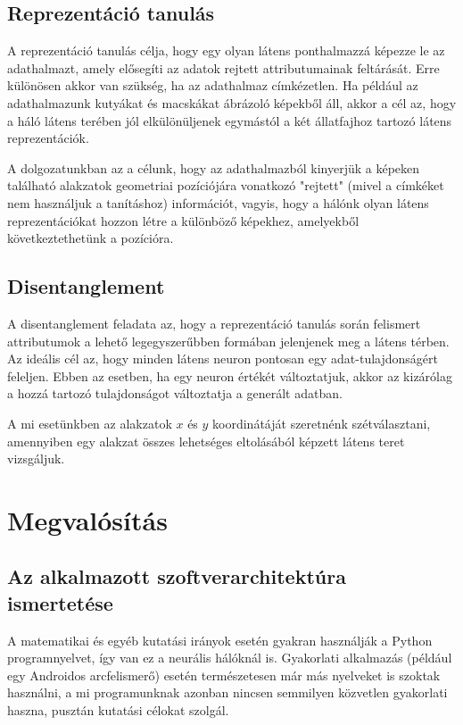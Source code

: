 \section{Reprezentáció tanulás}

A reprezentáció tanulás célja, hogy egy olyan látens ponthalmazzá képezze le az adathalmazt, amely elősegíti az adatok rejtett attributumainak feltárását. Erre különösen akkor van szükség, ha az adathalmaz címkézetlen. Ha például az adathalmazunk kutyákat és macskákat ábrázoló képekből áll, akkor a cél az, hogy a háló látens terében jól elkülönüljenek egymástól a két állatfajhoz tartozó látens reprezentációk.

A dolgozatunkban az a célunk, hogy az adathalmazból kinyerjük a képeken található alakzatok geometriai pozíciójára vonatkozó "rejtett" (mivel a címkéket nem használjuk a tanításhoz) információt, vagyis, hogy a hálónk olyan látens reprezentációkat hozzon létre a különböző képekhez, amelyekből következtethetünk a pozícióra.

\section{Disentanglement}

A disentanglement feladata az, hogy a reprezentáció tanulás során felismert attributumok a lehető legegyszerűbben formában jelenjenek meg a látens térben. Az ideális cél az, hogy minden látens neuron pontosan egy adat-tulajdonságért feleljen. Ebben az esetben, ha egy neuron értékét változtatjuk, akkor az kizárólag a hozzá tartozó tulajdonságot változtatja a generált adatban.

A mi esetünkben az alakzatok $x$ és $y$ koordinátáját szeretnénk szétválasztani, amennyiben egy alakzat összes lehetséges eltolásából képzett látens teret vizsgáljuk.

\chapter{Megvalósítás}

\section{Az alkalmazott szoftverarchitektúra ismertetése}

A matematikai és egyéb kutatási irányok esetén gyakran használják a Python programnyelvet, így van ez a neurális hálóknál is. Gyakorlati alkalmazás (például egy Androidos arcfelismerő) esetén természetesen már más nyelveket is szoktak használni, a mi programunknak azonban nincsen semmilyen közvetlen gyakorlati haszna, pusztán kutatási célokat szolgál.

